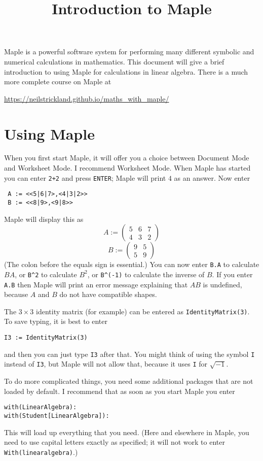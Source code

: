 \documentclass{amsart}
\title{Introduction to Maple}
\begin{document}
\maketitle

Maple is a powerful software system for performing many different
symbolic and numerical calculations in mathematics.  This document will
give a brief introduction to using Maple for calculations in linear algebra.
There is a much more complete course on Maple at 
\begin{center}
 \url{https://neilstrickland.github.io/maths_with_maple/}
\end{center}

\section*{Using Maple}

When you first start Maple, it will offer you a choice between
Document Mode and Worksheet Mode.  I recommend Worksheet Mode.  When
Maple has started you can enter \texttt{2+2} and press
\texttt{ENTER}; Maple will print $4$ as an answer.  Now enter
\begin{verbatim}
 A := <<5|6|7>,<4|3|2>>
 B := <<8|9>,<9|8>>
\end{verbatim}
Maple will display this as 
\[ A := 
   \begin{pmatrix}
    5 & 6 & 7 \\
    4 & 3 & 2 
   \end{pmatrix}
\]
\[ B := 
    \begin{pmatrix}
     9 & 5 \\ 5 & 9
    \end{pmatrix}
\]
(The colon before the equals sign is essential.)  You can now enter
\verb+B.A+ to calculate $BA$, or \verb+B^2+ to calculate $B^2$, or
\verb+B^(-1)+ to calculate the inverse of $B$.  If you enter
\verb+A.B+ then Maple will print an error message explaining that $AB$
is undefined, because $A$ and $B$ do not have compatible shapes.

The $3\times 3$ identity matrix (for example) can be entered as
\verb|IdentityMatrix(3)|.  To save typing, it is best to enter 
\begin{verbatim}
I3 := IdentityMatrix(3)
\end{verbatim}
and then you can just type \verb|I3| after that.  You might think of
using the symbol \verb|I| instead of \verb|I3|, but Maple will not
allow that, because it uses \verb|I| for $\sqrt{-1}$.

To do more complicated things, you need some additional packages that
are not loaded by default.  I recommend that as soon as you start
Maple you enter 
\begin{verbatim}
with(LinearAlgebra): 
with(Student[LinearAlgebra]):
\end{verbatim}
This will load up everything that you need.  (Here and elsewhere in
Maple, you need to use capital letters exactly as specified; it will
not work to enter \verb+With(linearalgebra)+.)
\end{document}
